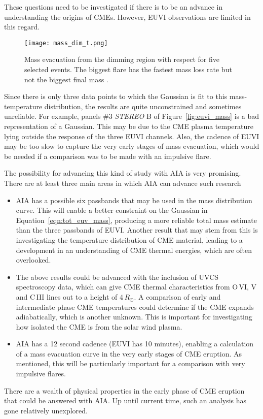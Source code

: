 These questions need to be investigated if there is to be an advance in understanding the origins of CMEs. However, EUVI observations are limited in this regard.
\begin{figure}[t!]
\begin{center}
\texttt{[image: mass\_dim\_t.png]}
\caption[Mass evacuation with time]{Mass evacuation from the dimming region with respect for five selected events. The biggest flare has the fastest mass loss rate but not the biggest final mass \citep{aschw09}.}
\label{fig:mass_dim_time}
\end{center}
\end{figure}
Since there is only three data points to which the Gaussian is fit to this mass-temperature distribution, the results are quite unconstrained and sometimes unreliable. For example, panels \#3 \emph{STEREO} B of Figure~\ref{fig:euvi_mass} is a bad representation of a Gaussian. This may be due to the CME plasma temperature lying outside the response of the three EUVI channels. Also, the cadence of EUVI may be too slow to capture the very early stages of mass evacuation, which would be needed if a comparison was to be made with an impulsive flare.

The possibility for advancing this kind of study with AIA is very promising. There are at least three main areas in which AIA can advance such research
\begin{itemize}
\item AIA has a possible six passbands that may be used in the mass distribution curve. This will enable a better constraint on the Gaussian in Equation~\ref{eqn:tot_euv_mass}, producing a more reliable total mass estimate than the three passbands of EUVI. Another result that may stem from this is investigating the temperature distribution of CME material, leading to a development in an understanding of CME thermal energies, which are often overlooked.
\item The above results could be advanced with the inclusion of UVCS spectroscopy data, which can give CME thermal characteristics from O\,VI, V and C\,III lines out to a height of $4\,R_{\odot}$. A comparison of early and intermediate phase CME temperatures could determine if the CME expands adiabatically, which is another unknown. This is important for investigating how isolated the CME is from the solar wind plasma.
\item AIA has a 12 second cadence (EUVI has 10 minutes), enabling a calculation of a mass evacuation curve in the very early stages of CME eruption. As mentioned, this will be particularly important for a comparison with very impulsive flares.
\end{itemize}
There are a wealth of physical properties in the early phase of CME eruption that could be answered with AIA. Up until current time, such an analysis has gone relatively unexplored.


